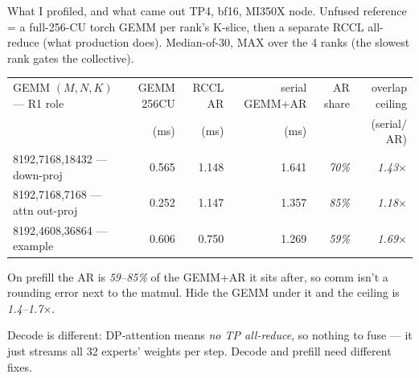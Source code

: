 \documentclass[pdf,aspectratio=169]{beamer}
\newcommand{\empy}[1]{{\color{darkorange}\emph{#1}}}
\newcommand{\empr}[1]{{\color{cardinalred}\emph{#1}}}
\newcommand{\examplebox}[2]{%
\begin{tcolorbox}[colframe=darkcardinal,colback=boxgray,title={#1}]
#2
\end{tcolorbox}}
\newcommand{\mc}[1]{{\ttfamily\small #1}}
\begin{document}
\begin{frame}{What I profiled, and what came out}
\small
TP4, bf16, MI350X node. Unfused reference = a full-256-CU torch GEMM per rank's K-slice, then a separate RCCL all-reduce (what production does). Median-of-30, MAX over the 4 ranks (the slowest rank gates the collective).
\begin{center}
\scriptsize\setlength{\tabcolsep}{5pt}
\begin{tabular}{l r r r r r}
\toprule
GEMM $(M,N,K)$ --- R1 role & GEMM 256CU & RCCL AR & serial GEMM+AR & AR share & overlap ceiling \\
 & (ms) & (ms) & (ms) & & (serial$/$AR) \\
\midrule
\mc{8192,7168,18432} --- down-proj     & 0.565 & 1.148 & 1.641 & \empr{70\%} & \empy{1.43$\times$} \\
\mc{8192,7168,7168}  --- attn out-proj & 0.252 & 1.147 & 1.357 & \empr{85\%} & \empy{1.18$\times$} \\
\mc{8192,4608,36864} --- example       & 0.606 & 0.750 & 1.269 & \empr{59\%} & \empy{1.69$\times$} \\
\bottomrule
\end{tabular}
\end{center}
\examplebox{The all-reduce is the expensive half}{\small
On prefill the AR is \empr{59--85\%} of the GEMM+AR it sits after, so comm isn't a rounding error next to the matmul. Hide the GEMM under it and the ceiling is \empy{1.4--1.7$\times$}.}

Decode is different: DP-attention means \empr{no TP all-reduce}, so nothing to fuse --- it just streams all 32 experts' weights per step. Decode and prefill need different fixes.
\end{frame}
\end{document}

